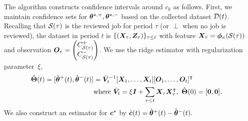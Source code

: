 The algorithm constructs confidence intervals around $c_k$ as follows. First, we maintain confidence sets for $\boldsymbol{\theta}^{\star,+}, \boldsymbol{\theta}^{\star,-}$ based on the collected dataset $\mathcal{D}(t)$. Recalling that $\mathcal{S}(\tau)$ is the reviewed job for period $\tau$ (or $\perp$ when no job is reviewed), the dataset in period $t$ is
$\{(\boldsymbol{X}_{\tau},\boldsymbol{Z}_{\tau})\}_{\tau \leq t}$ with feature $\boldsymbol{X}_{\tau} = \boldsymbol{\phi}_{\kappa}(\mathcal{S}(\tau))$ and observation $\boldsymbol{O}_{\tau} = \begin{pmatrix}C^+_{\mathcal{S}(\tau)} \\ C^-_{\mathcal{S}(\tau)} \end{pmatrix}$. We use the ridge estimator with regularization parameter~$\xi$, 
\begin{equation}\label{eq:regression}
\begin{aligned}
\hat{\boldsymbol{\Theta}}(t) = [\hat{\boldsymbol{\theta}}^+(t),\hat{\boldsymbol{\theta}}^-(t)] &=  \bar{\boldsymbol{V}}_t^{-1}[\boldsymbol{X}_1,\ldots,\boldsymbol{X}_{t}][\boldsymbol{O}_1,\ldots,\boldsymbol{O}_{t}]^{\intercal} \\
&\text{where}~ \bar{\boldsymbol{V}}_{t} = \xi \boldsymbol{I} + \sum_{\tau \leq t} \boldsymbol{X}_{\tau}\boldsymbol{X}_{\tau}^{\intercal},~ \hat{\boldsymbol{\Theta}}(0) = [\boldsymbol{0},\boldsymbol{0}].
\end{aligned}
\end{equation}
We also construct an estimator for $\boldsymbol{c}^{\star}$ by $\hat{\boldsymbol{c}}(t) = \hat{\boldsymbol{\theta}}^+(t) - \hat{\boldsymbol{\theta}}^-(t).$

